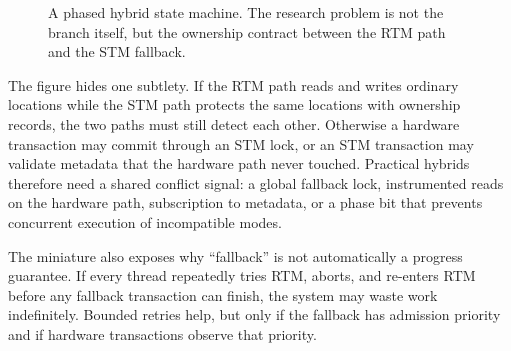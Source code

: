 \begin{figure}[htbp]
\centering
{}%

\caption{A phased hybrid state machine. The research problem is not the branch itself, but the ownership contract between the RTM path and the STM fallback.}
\label{fig:phased-hybrid-state}
\end{figure}

The figure hides one subtlety. If the RTM path reads and writes ordinary locations while the STM path protects the same locations with ownership records, the two paths must still detect each other. Otherwise a hardware transaction may commit through an STM lock, or an STM transaction may validate metadata that the hardware path never touched. Practical hybrids therefore need a shared conflict signal: a global fallback lock, instrumented reads on the hardware path, subscription to metadata, or a phase bit that prevents concurrent execution of incompatible modes.

The miniature also exposes why ``fallback'' is not automatically a progress guarantee. If every thread repeatedly tries RTM, aborts, and re-enters RTM before any fallback transaction can finish, the system may waste work indefinitely. Bounded retries help, but only if the fallback has admission priority and if hardware transactions observe that priority.

